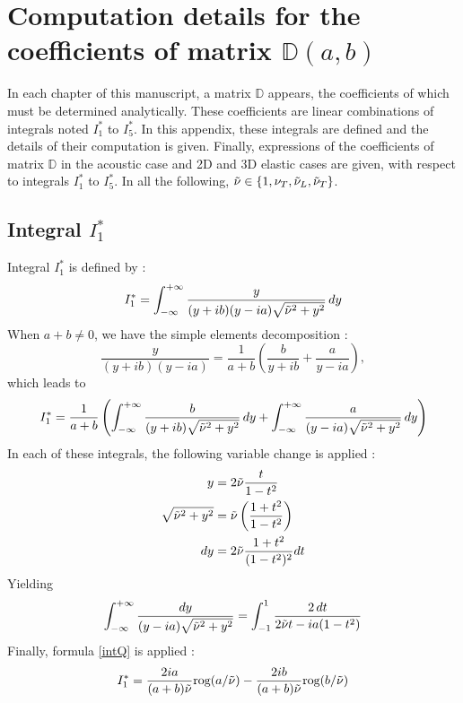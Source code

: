 \chapter{Computation details for the coefficients of matrix $\mathbb{D}(a,b)$}
\label{matD}
In each chapter of this manuscript, a matrix $\mathbb{D}$ appears, the coefficients of which must be determined analytically. These coefficients are linear combinations of integrals noted $I_1^*$ to $I_5^*$. In this appendix, these integrals are defined and the details of their computation is given. Finally, expressions of the coefficients of matrix $\mathbb{D}$ in the acoustic case and 2D and 3D elastic cases are given, with respect to integrals $I_1^*$ to $I_5^*$. In all the following, $\tilde{\nu} \in \{ 1,\nu_T,\tilde{\nu}_L,\tilde{\nu}_T \}$.

\section{Integral $I_1^*$}
\label{calcI1}
Integral $I_1^*$ is defined by :
\begin{equation}
\label{defI1}
I_1^*=\int_{-\infty}^{+\infty} \frac{y}{(y+ib)(y-ia)\sqrt{\tilde{\nu}^2+y^2}}\,dy
\end{equation}
When $a+b \neq 0$, we have the simple elements decomposition :
\begin{equation}
\frac{y}{(y+ib)(y-ia)}=\frac{1}{a+b} \left( \frac{b}{y+ib}+\frac{a}{y-ia} \right), 
\label{decomp2}
\end{equation}
which leads to
\begin{equation}
I_1^*= \frac{1}{a+b} \left( \int_{-\infty}^{+\infty} \frac{b}{(y+ib)\sqrt{\tilde{\nu}^2+y^2}} \,dy +\int_{-\infty}^{+\infty} \frac{a}{(y-ia)\sqrt{\tilde{\nu}^2+y^2}} \,dy \right)
\end{equation}
In each of these integrals, the following variable change is applied :
\begin{equation}
\begin{split}
 y&=2\tilde{\nu} \frac{t}{1-t^2} \\
\sqrt{\tilde{\nu}^2+y^2}&=\tilde{\nu}\left( \frac{1+t^2}{1-t^2} \right)  \\
 dy&= 2\tilde{\nu} \frac{1+t^2}{(1-t^2)^2}dt 
\end{split}
\label{changevar}
\end{equation}
Yielding
\begin{equation}
\int_{-\infty}^{+\infty} \frac{dy}{(y-ia)\sqrt{\tilde{\nu}^2+y^2}}=\int_{-1}^1\frac{2\,dt}{2\tilde{\nu} t-ia(1-t^2)}
\end{equation}
Finally, formula \eqref{intQ} is applied :
\begin{equation}
I_1^*=\frac{2ia}{(a+b)\tilde{\nu}}\mbox{rog}(a/\tilde{\nu})-\frac{2ib}{(a+b)\tilde{\nu}}\mbox{rog}(b/\tilde{\nu})
\label{valI1}
\end{equation}

